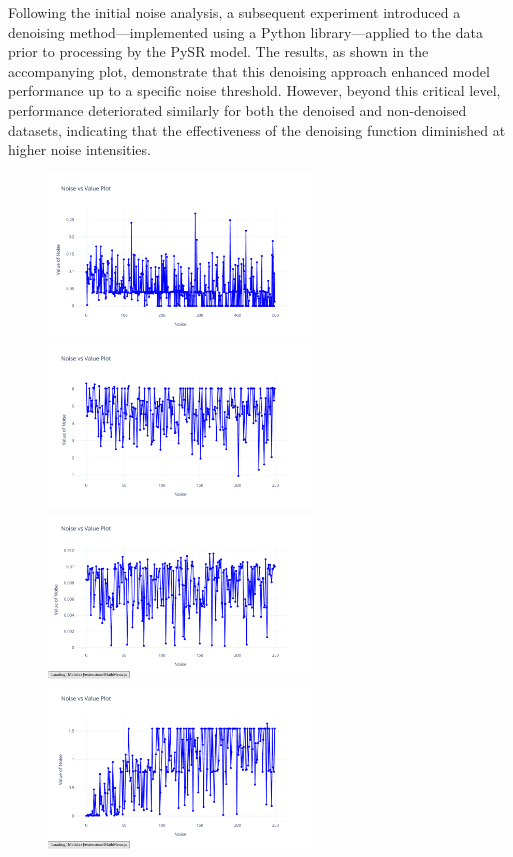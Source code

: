 \documentclass{article}
\begin{document}
Following the initial noise analysis, a subsequent experiment introduced a denoising method—implemented using a Python library—applied to the data prior to processing by the PySR model. The results, as shown in the accompanying plot, demonstrate that this denoising approach enhanced model performance up to a specific noise threshold. However, beyond this critical level, performance deteriorated similarly for both the denoised and non-denoised datasets, indicating that the effectiveness of the denoising function diminished at higher noise intensities.\cite{Wood2022} \\



\begin{figure}[H]
    \centering
    \includegraphics[width=7cm]{noise_conservation_d_r}
    \includegraphics[width=7cm]{noise_Newtons_First_Law_d_r}
    \includegraphics[width=7cm]{noise_Newtons_Second_Law_d_r}
    \includegraphics[width=7cm]{noise_Newtons_Third_Law_d_r}

\end{figure}
\end{document}
